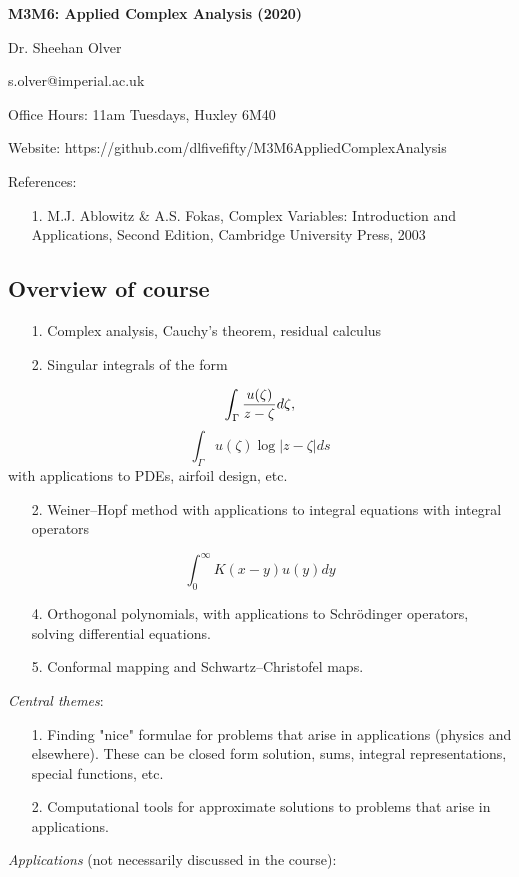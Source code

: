 \documentclass[12pt,a4paper]{article}
\def\endash{–}
\begin{document}
\textbf{M3M6: Applied Complex Analysis (2020)}

Dr. Sheehan Olver

s.olver@imperial.ac.uk

Office Hours: 11am Tuesdays, Huxley 6M40

Website: https://github.com/dlfivefifty/M3M6AppliedComplexAnalysis

References: 

\begin{itemize}
\item[1. ] M.J. Ablowitz \& A.S. Fokas, Complex Variables: Introduction and Applications, Second Edition, Cambridge University Press, 2003

\end{itemize}
\subsection{Overview of course}
\begin{itemize}
\item[1. ] Complex analysis, Cauchy's theorem, residual calculus


\item[2. ] Singular integrals of the form

\end{itemize}
\[
\int_\Gamma {u(\zeta) \over z - \zeta}  d\zeta,
\]
\[
\int_\Gamma u(\zeta) \log|z - \zeta|  ds
\]
with applications to PDEs, airfoil design, etc.

\begin{itemize}
\item[2. ] Weiner\ensuremath{\endash}Hopf method with applications to integral equations with integral operators

\end{itemize}
\[
\int_0^\infty K(x-y) u(y)  dy
\]
\begin{itemize}
\item[4. ] Orthogonal polynomials, with applications to Schrödinger operators, solving differential equations.


\item[5. ] Conformal mapping and Schwartz\ensuremath{\endash}Christofel maps. 

\end{itemize}
\emph{Central themes}: 

\begin{itemize}
\item[1. ] Finding "nice" formulae for problems that arise in applications (physics and elsewhere). These can be closed form solution, sums, integral representations, special functions, etc.


\item[2. ] Computational tools for approximate solutions to problems that arise in applications.

\end{itemize}
\emph{Applications} (not necessarily discussed in the course):
\end{document}
